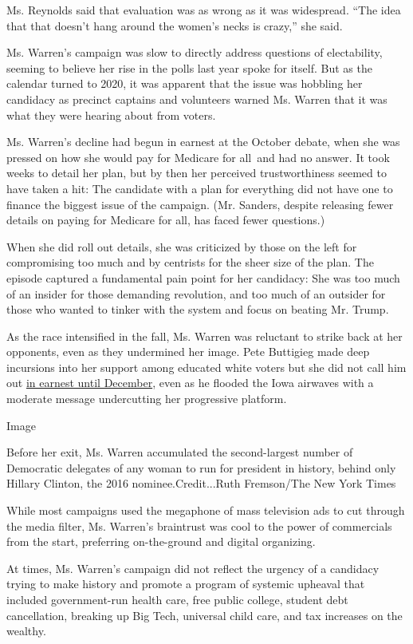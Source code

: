 Ms. Reynolds said that evaluation was as wrong as it was widespread.
``The idea that that doesn't hang around the women's necks is crazy,''
she said.

Ms. Warren's campaign was slow to directly address questions of
electability, seeming to believe her rise in the polls last year spoke
for itself. But as the calendar turned to 2020, it was apparent that the
issue was hobbling her candidacy as precinct captains and volunteers
warned Ms. Warren that it was what they were hearing about from voters.

Ms. Warren's decline had begun in earnest at the October debate, when
she was pressed on how she would pay for Medicare for all~and had no
answer. It took weeks to detail her plan, but by then her perceived
trustworthiness seemed to have taken a hit: The candidate with a plan
for everything did not have one to finance the biggest issue of the
campaign. (Mr. Sanders, despite releasing fewer details on paying for
Medicare for all, has faced fewer questions.)

When she did roll out details, she was criticized by those on the left
for compromising too much and by centrists for the sheer size of the
plan. The episode captured a fundamental pain point for her candidacy:
She was too much of an insider for those demanding revolution, and too
much of an outsider for those who wanted to tinker with the system and
focus on beating Mr. Trump.

As the race intensified in the fall, Ms. Warren was reluctant to strike
back at her opponents, even as they undermined her image. Pete Buttigieg
made deep incursions into her support among educated white voters but
she did not call him out
\href{https://www.nytimes.com/2019/12/05/us/politics/elizabeth-warren-pete-buttigieg.html}{in
earnest until December}, even as he flooded the Iowa airwaves with a
moderate message undercutting her progressive platform.

Image

Before her exit, Ms. Warren accumulated the second-largest number of
Democratic delegates of any woman to run for president in history,
behind only Hillary Clinton, the 2016 nominee.Credit...Ruth Fremson/The
New York Times

While most campaigns used the megaphone of mass television ads to cut
through the media filter, Ms. Warren's braintrust was cool to the power
of commercials from the start, preferring on-the-ground and digital
organizing.

At times, Ms. Warren's campaign did not reflect the urgency of a
candidacy trying to make history and promote a program of systemic
upheaval that included government-run health care, free public college,
student debt cancellation, breaking up Big Tech, universal child care,
and tax increases on the wealthy.

